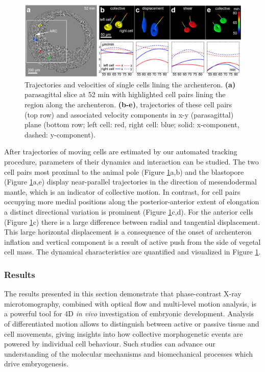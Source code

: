 \begin{figure}[ht]
  \centerline{
    \includegraphics[scale = 0.33]{figures/app_embryo_tracking.PNG} 
  }  
  \caption{Trajectories and velocities of single cells lining the archenteron. \textbf{(a)} parasagittal slice at 52 min with highlighted cell pairs lining the region along the archenteron. \textbf{(b-e)}, trajectories of these cell pairs (top row) and associated velocity components in x-y (parasagittal) plane (bottom row; left cell: red, right cell: blue; solid: x-component, dashed: y-component).}
  \label{fig:app_embryo_tracking}
\end{figure}

After trajectories of moving cells are estimated by our automated tracking procedure, parameters of their dynamics and interaction can be studied.
The two cell pairs most proximal to the animal pole (Figure \ref{fig:app_embryo_tracking}a,b) and the blastopore (Figure \ref{fig:app_embryo_tracking}a,e) display near-parallel trajectories in the direction of mesendodermal mantle, which is an indicator of collective motion.
In contrast, for cell pairs occupying more medial positions along the posterior-anterior extent of elongation a distinct directional variation is prominent (Figure \ref{fig:app_embryo_tracking}c,d).  For the anterior cells (Figure \ref{fig:app_embryo_tracking}c) there is a large difference between radial and tangential displacement. This large horizontal displacement is a consequence of the onset of archenteron inflation and vertical component is a result of active push from the side of vegetal cell mass. The dynamical characteristics are quantified and visualized in Figure \ref{fig:app_embryo_tracking}.


\subsubsection{Results}

The results presented in this section demonstrate that phase-contrast X-ray microtomography, combined with optical flow and multi-level motion analysis, is a powerful tool for 4D \textit{in vivo} investigation of embryonic
development. Analysis of differentiated motion allows to distinguish between active or passive tissue and cell movements, giving
insights into how collective morphogenetic events are powered by individual cell behaviour. Such studies can advance our understanding of the molecular mechanisms and biomechanical processes which drive embryogenesis.





